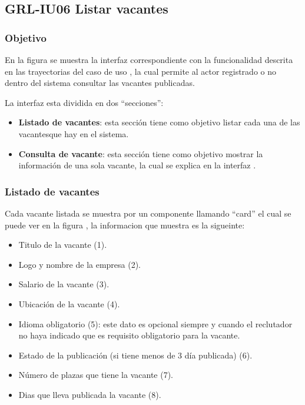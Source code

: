 \clearpage
\subsection{GRL-IU06 Listar vacantes}

\subsubsection{Objetivo}
En la figura  se muestra la interfaz correspondiente con la funcionalidad descrita en las
trayectorias del caso de uso  , la cual permite al actor registrado o no dentro del sistema consultar 
las vacantes publicadas.

La interfaz esta dividida en dos ``secciones'':
\begin{itemize}
   \item \textbf{Listado de vacantes}: esta sección tiene como objetivo listar cada una de las vacantesque hay en el sistema.
   \item \textbf{Consulta de vacante}: esta sección tiene como objetivo mostrar la información de una sola vacante, la cual se explica en 
   la interfaz .
\end{itemize}


\subsubsection{Listado de vacantes}
Cada vacante listada se muestra por un componente llamando ``card'' el cual se puede ver en la figura , la informacion que 
muestra es la sigueinte: 
\begin{itemize}
   \item Titulo de la vacante (1).
   \item Logo y nombre de la empresa (2).
   \item Salario de la vacante (3).
   \item Ubicación de la vacante (4).
   \item Idioma obligatorio (5): este dato es opcional siempre y cuando el reclutador no haya indicado que es requisito obligatorio 
   para la vacante.
   \item Estado de la publicación (si tiene menos de 3 día publicada) (6).
   \item Número de plazas que tiene la vacante (7).
   \item Dias que lleva publicada la vacante (8).
\end{itemize}

